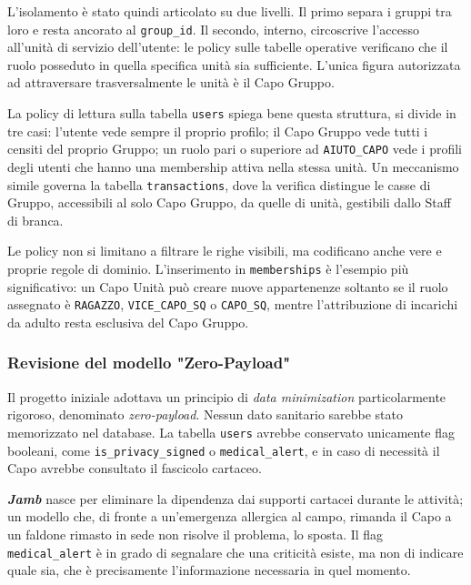 \documentclass[11pt]{article}
\numberwithin{figure}{section}
\begin{document}
L'isolamento è stato quindi articolato su due livelli. Il primo separa i gruppi tra loro e resta ancorato al \texttt{group\_id}. Il secondo, interno, circoscrive l'accesso all'unità di servizio dell'utente: le policy sulle tabelle operative verificano che il ruolo posseduto in quella specifica unità sia sufficiente. L'unica figura autorizzata ad attraversare trasversalmente le unità è il Capo Gruppo.

La policy di lettura sulla tabella \texttt{users} spiega bene questa struttura, si divide in tre casi: l'utente vede sempre il proprio profilo; il Capo Gruppo vede tutti i censiti del proprio Gruppo; un ruolo pari o superiore ad \texttt{AIUTO\_CAPO} vede i profili degli utenti che hanno una membership attiva nella stessa unità. Un meccanismo simile governa la tabella \texttt{transactions}, dove la verifica distingue le casse di Gruppo, accessibili al solo Capo Gruppo, da quelle di unità, gestibili dallo Staff di branca.

Le policy non si limitano a filtrare le righe visibili, ma codificano anche vere e proprie regole di dominio. L'inserimento in \texttt{memberships} è l'esempio più significativo: un Capo Unità può creare nuove appartenenze soltanto se il ruolo assegnato è \texttt{RAGAZZO}, \texttt{VICE\_CAPO\_SQ} o \texttt{CAPO\_SQ}, mentre l'attribuzione di incarichi da adulto resta esclusiva del Capo Gruppo.

\subsubsection{Revisione del modello "Zero-Payload"}

Il progetto iniziale adottava un principio di \textit{data minimization} particolarmente rigoroso, denominato \textit{zero-payload}. Nessun dato sanitario sarebbe stato memorizzato nel database. La tabella \texttt{users} avrebbe conservato unicamente flag booleani, come \texttt{is\_privacy\_signed} o \texttt{medical\_alert}, e in caso di necessità il Capo avrebbe consultato il fascicolo cartaceo.

\textbf{\textit{Jamb}} nasce per eliminare la dipendenza dai supporti cartacei durante le attività; un modello che, di fronte a un'emergenza allergica al campo, rimanda il Capo a un faldone rimasto in sede non risolve il problema, lo sposta. Il flag \texttt{medical\_alert} è in grado di segnalare che una criticità esiste, ma non di indicare quale sia, che è precisamente l'informazione necessaria in quel momento.
\end{document}

